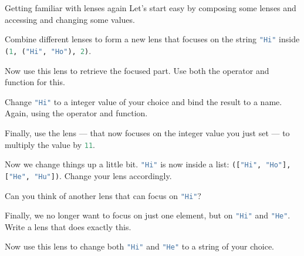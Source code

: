 \documentclass{exercise}
\newcommand\h[2][]{\lstinline[language=haskell,#1]{#2}}
\begin{document}
	\begin{exercise}{Getting familiar with lenses again}
		Let's start easy by composing some lenses and accessing and changing some
		values.
		\begin{tasks}
			\item Combine different lenses to form a new lens that focuses on the string
				\h{"Hi"} inside \h{(1, ("Hi", "Ho"), 2)}.
			\item Now use this lens to retrieve the focused part. Use both the operator
				and function for this.
			\item Change \h{"Hi"} to a integer value of your choice and bind the result
				to a name. Again, using the operator and function.
			\item Finally, use the lens --- that now focuses on the integer value you
				just set --- to multiply the value by \h{11}.
			\item Now we change things up a little bit. \h{"Hi"} is now inside a list:
				\h{(["Hi", "Ho"], ["He", "Hu"])}. Change your lens accordingly.
			\item Can you think of another lens that can focus on \h{"Hi"}?
			\item Finally, we no longer want to focus on just one element, but on
				\h{"Hi"} and \h{"He"}. Write a lens that does exactly this.
			\item Now use this lens to change both \h{"Hi"} and \h{"He"} to a string of
				your choice.
		\end{tasks}
	\end{exercise}
\end{document}
